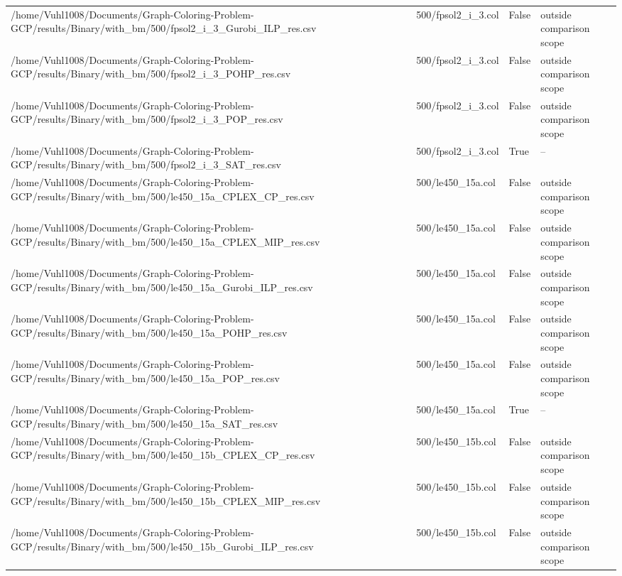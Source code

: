 \begin{table}[htbp]
\begin{tabular}{llll}
/home/Vuhl1008/Documents/Graph-Coloring-Problem-GCP/results/Binary/with\_bm/500/fpsol2\_i\_3\_Gurobi\_ILP\_res.csv & 500/fpsol2\_i\_3.col & False & outside comparison scope \\
/home/Vuhl1008/Documents/Graph-Coloring-Problem-GCP/results/Binary/with\_bm/500/fpsol2\_i\_3\_POHP\_res.csv & 500/fpsol2\_i\_3.col & False & outside comparison scope \\
/home/Vuhl1008/Documents/Graph-Coloring-Problem-GCP/results/Binary/with\_bm/500/fpsol2\_i\_3\_POP\_res.csv & 500/fpsol2\_i\_3.col & False & outside comparison scope \\
/home/Vuhl1008/Documents/Graph-Coloring-Problem-GCP/results/Binary/with\_bm/500/fpsol2\_i\_3\_SAT\_res.csv & 500/fpsol2\_i\_3.col & True & -- \\
/home/Vuhl1008/Documents/Graph-Coloring-Problem-GCP/results/Binary/with\_bm/500/le450\_15a\_CPLEX\_CP\_res.csv & 500/le450\_15a.col & False & outside comparison scope \\
/home/Vuhl1008/Documents/Graph-Coloring-Problem-GCP/results/Binary/with\_bm/500/le450\_15a\_CPLEX\_MIP\_res.csv & 500/le450\_15a.col & False & outside comparison scope \\
/home/Vuhl1008/Documents/Graph-Coloring-Problem-GCP/results/Binary/with\_bm/500/le450\_15a\_Gurobi\_ILP\_res.csv & 500/le450\_15a.col & False & outside comparison scope \\
/home/Vuhl1008/Documents/Graph-Coloring-Problem-GCP/results/Binary/with\_bm/500/le450\_15a\_POHP\_res.csv & 500/le450\_15a.col & False & outside comparison scope \\
/home/Vuhl1008/Documents/Graph-Coloring-Problem-GCP/results/Binary/with\_bm/500/le450\_15a\_POP\_res.csv & 500/le450\_15a.col & False & outside comparison scope \\
/home/Vuhl1008/Documents/Graph-Coloring-Problem-GCP/results/Binary/with\_bm/500/le450\_15a\_SAT\_res.csv & 500/le450\_15a.col & True & -- \\
/home/Vuhl1008/Documents/Graph-Coloring-Problem-GCP/results/Binary/with\_bm/500/le450\_15b\_CPLEX\_CP\_res.csv & 500/le450\_15b.col & False & outside comparison scope \\
/home/Vuhl1008/Documents/Graph-Coloring-Problem-GCP/results/Binary/with\_bm/500/le450\_15b\_CPLEX\_MIP\_res.csv & 500/le450\_15b.col & False & outside comparison scope \\
/home/Vuhl1008/Documents/Graph-Coloring-Problem-GCP/results/Binary/with\_bm/500/le450\_15b\_Gurobi\_ILP\_res.csv & 500/le450\_15b.col & False & outside comparison scope \\

\end{tabular}
\end{table}

